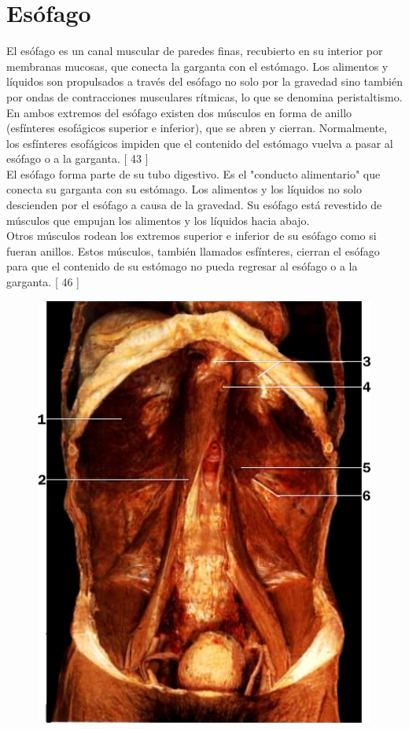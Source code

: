 \section{Esófago}
El esófago es un canal muscular de paredes finas, recubierto en su interior por membranas mucosas, que conecta la garganta con el estómago. Los alimentos 
y líquidos son propulsados a través del esófago no solo por la gravedad sino también por ondas de contracciones musculares rítmicas, lo que se denomina peristaltismo. 
En ambos extremos del esófago existen dos músculos en forma de anillo (esfínteres esofágicos superior e inferior), que se abren y cierran. Normalmente, los esfínteres 
esofágicos impiden que el contenido del estómago vuelva a pasar al esófago o a la garganta. [ 43 ]\\
El esófago forma parte de su tubo digestivo. Es el "conducto alimentario" que conecta su garganta con su estómago. Los alimentos y los líquidos no solo descienden por 
el esófago a causa de la gravedad. Su esófago está revestido de músculos que empujan los alimentos y los líquidos hacia abajo.\\
Otros músculos rodean los extremos superior e inferior de su esófago como si fueran anillos. Estos músculos, también llamados esfínteres, cierran el esófago para que 
el contenido de su estómago no pueda regresar al esófago o a la garganta. [ 46 ]\\
\begin{figure}[H]
	\begin{center}
 		\includegraphics[width = 1\textwidth]{v2/images/image39.png}
	\end{center} 
\end{figure}
